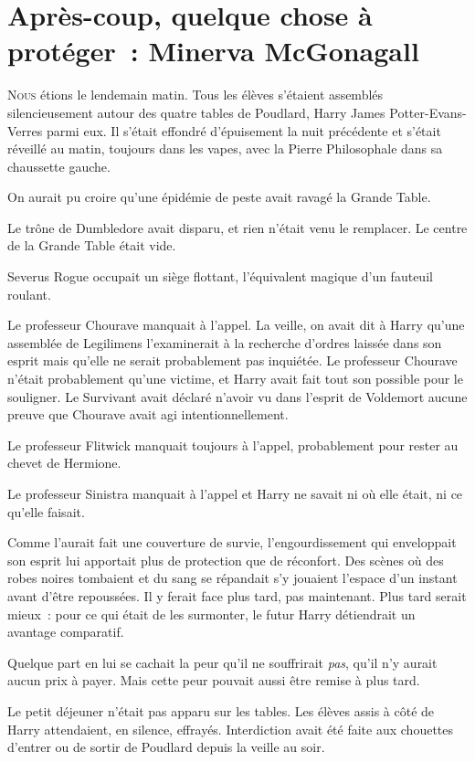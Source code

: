 \chapter{Après-coup, quelque chose à protéger~: Minerva McGonagall}

\lettrine{N}{ous} étions le lendemain matin. Tous les élèves s'étaient assemblés silencieusement autour des quatre tables de Poudlard, Harry James Potter-Evans-Verres parmi eux. Il s'était effondré d'épuisement la nuit précédente et s'était réveillé au matin, toujours dans les vapes, avec la Pierre Philosophale dans sa chaussette gauche.

On aurait pu croire qu'une épidémie de peste avait ravagé la Grande Table.

Le trône de Dumbledore avait disparu, et rien n'était venu le remplacer. Le centre de la Grande Table était vide.

Severus Rogue occupait un siège flottant, l'équivalent magique d'un fauteuil roulant.

Le professeur Chourave manquait à l'appel. La veille, on avait dit à Harry qu'une assemblée de Legilimens l'examinerait à la recherche d'ordres laissée dans son esprit mais qu'elle ne serait probablement pas inquiétée. Le professeur Chourave n'était probablement qu'une victime, et Harry avait fait tout son possible pour le souligner. Le Survivant avait déclaré n'avoir vu dans l'esprit de Voldemort aucune preuve que Chourave avait agi intentionnellement.

Le professeur Flitwick manquait toujours à l'appel, probablement pour rester au chevet de Hermione.

Le professeur Sinistra manquait à l'appel et Harry ne savait ni où elle était, ni ce qu'elle faisait.

Comme l'aurait fait une couverture de survie, l'engourdissement qui enveloppait son esprit lui apportait plus de protection que de réconfort. Des scènes où des robes noires tombaient et du sang se répandait s'y jouaient l'espace d'un instant avant d'être repoussées. Il y ferait face plus tard, pas maintenant. Plus tard serait mieux~: pour ce qui était de les surmonter, le futur Harry détiendrait un avantage comparatif.

Quelque part en lui se cachait la peur qu'il ne souffrirait \emph{pas}, qu'il n'y aurait aucun prix à payer. Mais cette peur pouvait aussi être remise à plus tard.

Le petit déjeuner n'était pas apparu sur les tables. Les élèves assis à côté de Harry attendaient, en silence, effrayés. Interdiction avait été faite aux chouettes d'entrer ou de sortir de Poudlard depuis la veille au soir.

